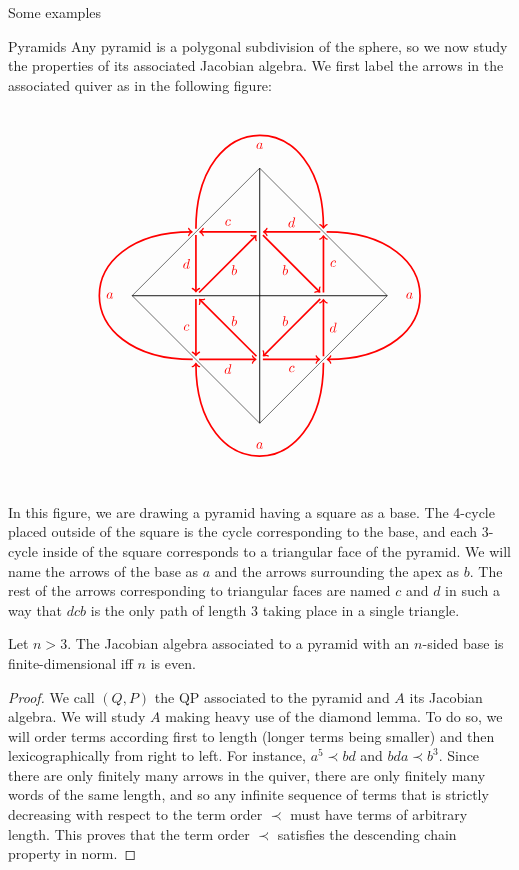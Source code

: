 \begin{chapter}{Some examples}
\begin{section}{Pyramids}
Any pyramid is a polygonal subdivision of the sphere, so we now study the properties of its associated Jacobian algebra. We first label the arrows in the associated quiver as in the following figure:
\[\label{pyramid}
\begin{tikzpicture}[scale=0.8]
\foreach \x in {0,90,...,270}
{
\begin{scope}[rotate=\x]
\draw (0,0) -- (4,0);
\draw (0,0) -- (0,-4);
\draw (4,0) -- (0,-4);
\node at (0.8,-0.8) {\textcolor{red}{$b$}};
\node at (1,-2.3) {\textcolor{red}{$c$}};
\node at (2.3,-1) {\textcolor{red}{$d$}};
\node at (0,-4.7) {\textcolor{red}{$a$}};
\draw [<-, red, very thick] (0.1, -1.9) to (1.9, -0.1);
\draw [<-, red, very thick] (2, -0.1) to  (2, -1.9);
\draw [<-, red, very thick] (1.9, -2) to  (0.1, -2);
\draw [<-, red, very thick] (-2, -2.1) to [bend right=90, looseness=2.5] (2, -2.1);
\end{scope}
}
\end{tikzpicture}
\]
In this figure, we are drawing a pyramid having a square as a base. The 4-cycle placed outside of the square is the cycle corresponding to the base, and each 3-cycle inside of the square corresponds to a triangular face of the pyramid. We will name the arrows of the base as $a$ and the arrows surrounding the apex as $b$. The rest of the arrows corresponding to triangular faces are named $c$ and $d$ in such a way that $dcb$ is the only path of length 3 taking place in a single triangle.

\begin{thm} Let $n>3$. The Jacobian algebra  associated to a pyramid with an $n$-sided base is finite-dimensional iff $n$ is even.
\end{thm}
\begin{proof} We call $(Q,P)$ the QP associated to the pyramid and $A$ its Jacobian algebra. We will study $A$ making heavy use of the diamond lemma. To do so, we will order terms according first to length (longer terms being smaller) and then lexicographically from right to left. For instance, $a^5 \prec bd$ and $bda \prec b^3$. Since there are only finitely many arrows in the quiver, there are only finitely many words of the same length, and so any infinite sequence of terms that is strictly decreasing with respect to the term order $\prec$ must have terms of arbitrary length. This proves that the term order $\prec$ satisfies the descending chain property in norm.


\end{proof}
\end{section}
\end{chapter}
